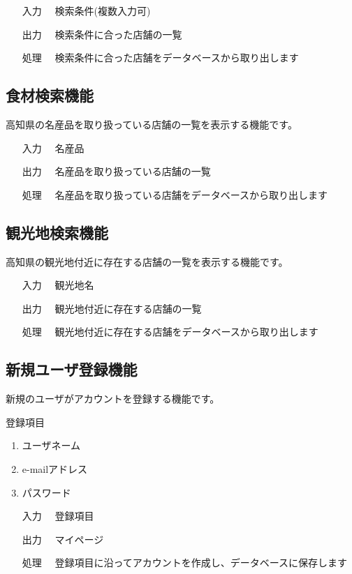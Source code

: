 \documentclass[a4j,titlepage]{jarticle}
\begin{document}
\begin{enumerate}
\item [入力]　検索条件(複数入力可)
\item [出力]　検索条件に合った店舗の一覧
\item [処理]　検索条件に合った店舗をデータベースから取り出します
\end{enumerate}

\subsection{食材検索機能}
高知県の名産品を取り扱っている店舗の一覧を表示する機能です。

\begin{enumerate}
  \item [入力]　名産品
  \item [出力]　名産品を取り扱っている店舗の一覧
  \item [処理]　名産品を取り扱っている店舗をデータベースから取り出します
\end{enumerate}

\subsection{観光地検索機能}
高知県の観光地付近に存在する店舗の一覧を表示する機能です。

\begin{enumerate}
  \item [入力]　観光地名
  \item [出力]　観光地付近に存在する店舗の一覧
  \item [処理]　観光地付近に存在する店舗をデータベースから取り出します
\end{enumerate}

\subsection{新規ユーザ登録機能}
新規のユーザがアカウントを登録する機能です。

登録項目
\begin{enumerate}
  \item ユーザネーム
  \item e-mailアドレス
  \item パスワード
\end{enumerate}

\begin{enumerate}
  \item [入力]　登録項目
  \item [出力]　マイページ
  \item [処理]　登録項目に沿ってアカウントを作成し、データベースに保存します
\end{enumerate}
\end{document}
